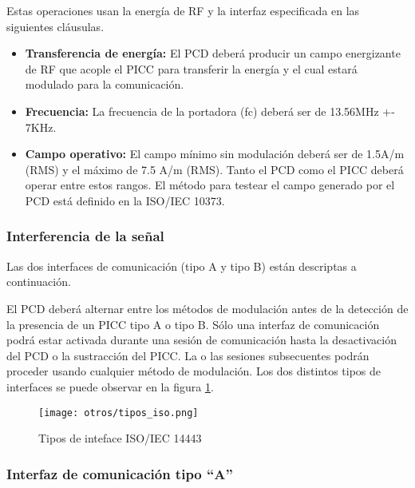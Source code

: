 Estas operaciones usan la energía de RF y la interfaz especificada en las siguientes cláusulas.

\begin{itemize}
\item \textbf{Transferencia de energía:} El PCD deberá producir un campo energizante de RF que acople el PICC para transferir la energía y el cual estará modulado para la comunicación.
\item \textbf{Frecuencia:} La frecuencia de la portadora (fc) deberá ser de 13.56MHz +- 7KHz.
\item \textbf{Campo operativo:} El campo mínimo sin modulación deberá ser de 1.5A/m (RMS) y el máximo de 7.5 A/m (RMS). Tanto el PCD como el PICC deberá operar entre estos rangos. El método para testear el campo generado por el PCD está definido en la ISO/IEC 10373.
\end{itemize}

\subsubsection{Interferencia de la señal}

Las dos interfaces de comunicación (tipo A y tipo B) están descriptas a continuación.

El PCD deberá alternar entre los métodos de modulación antes de la detección de la presencia de un PICC tipo A o tipo B. Sólo una interfaz de comunicación podrá estar activada durante una sesión de comunicación hasta la desactivación del PCD o la sustracción del PICC. La o las sesiones subsecuentes podrán proceder usando cualquier método de modulación. Los dos distintos tipos de interfaces se puede observar en la figura \ref{fig:tipos_iso}.

\begin{figure}[H]
\centering
\texttt{[image: otros/tipos\_iso.png]}
\caption{Tipos de inteface ISO/IEC 14443}
\label{fig:tipos_iso}
\end{figure}

\subsubsection{Interfaz de comunicación tipo “A”}


